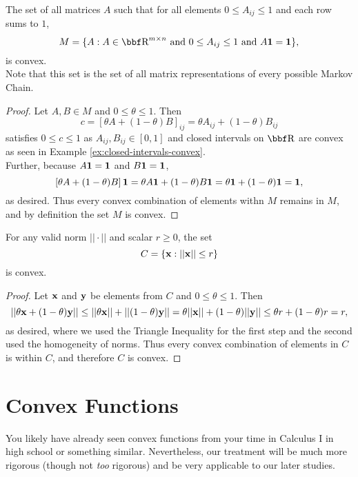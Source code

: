 \documentclass{article}
\begin{document}
\begin{example}
    The set of all matrices $A$ such that for all elements $0 \leq A_{ij} \leq 1$
    and each row sums to $1$,
    \[
        M = \{A : A\in\RR^{m\times n} \text{ and } 0\leq A_{ij}\leq1 \text{ and } A\1 = \1\},
    \]
    is convex.\\

    Note that this set is the set of all matrix representations of every possible
    Markov Chain.
\end{example}
\begin{proof}
    Let $A,B\in M$ and $0\leq\theta\leq1$. Then
    \[
        c = \left[ \theta A + (1-\theta)B \right]_{ij} = \theta A_{ij} + (1-\theta)B_{ij}
    \]
    satisfies $0\leq c\leq 1$ as $A_{ij},B_{ij}\in [0,1]$ and closed intervals
    on $\RR$ are convex as seen in Example \ref{ex:closed-intervals-convex}.\\

    Further, because $A{\bf 1}={\bf 1}$ and $B{\bf 1}={\bf 1}$,
    \[
        \left[\theta A + (1-\theta)B\right]{\bf 1} = \theta A{\bf 1} + (1-\theta)B{\bf 1} = \theta{\bf 1} + (1-\theta){\bf 1} = {\bf 1},
    \]
    as desired. Thus every convex combination of elements withn $M$ remains in
    $M$, and by definition the set $M$ is convex.
\end{proof}

\begin{example}
    For any valid norm $||\cdot||$ and scalar $r \geq 0$, the set
    \[
        C = \{{\bf x} : ||{\bf x}|| \leq r\}
    \]
    is convex.
\end{example}
\begin{proof}
     Let ${\bf x}$ and ${\bf y}$ be elements from $C$ and $0\leq\theta\leq1$. Then
     \[
         ||\theta{\bf x} + (1-\theta){\bf y}|| \leq ||\theta{\bf x}|| + ||(1-\theta){\bf y}|| = \theta||{\bf x}|| + (1-\theta)||{\bf y}|| \leq \theta r + (1-\theta)r = r,
     \]
     as desired, where we used the Triangle Inequality for the first step
     and the second used the homogeneity of norms. Thus every convex combination
     of elements in $C$ is within $C$, and therefore $C$ is convex.
\end{proof}



\section{Convex Functions}

You likely have already seen convex functions from your time in Calculus I in high
school or something similar. Nevertheless, our treatment will be much more rigorous
(though not \textit{too} rigorous) and be very applicable to our later studies.\\
\end{document}
